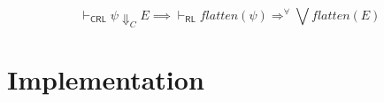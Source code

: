 \documentclass{article}
\newcommand{\RL}{\mathsf{RL}}
\newcommand{\CRL}{\mathsf{CRL}}
\begin{document}
\begin{lemma}
    \begin{equation*}
        \vdash_\CRL \psi \Downarrow_{C} E
        \implies
        \vdash_\RL \mathit{flatten}(\psi) \Rightarrow^\forall \bigvee  \mathit{flatten}(E)
    \end{equation*}
\end{lemma}

\section{Implementation}




\appendix
\end{document}
